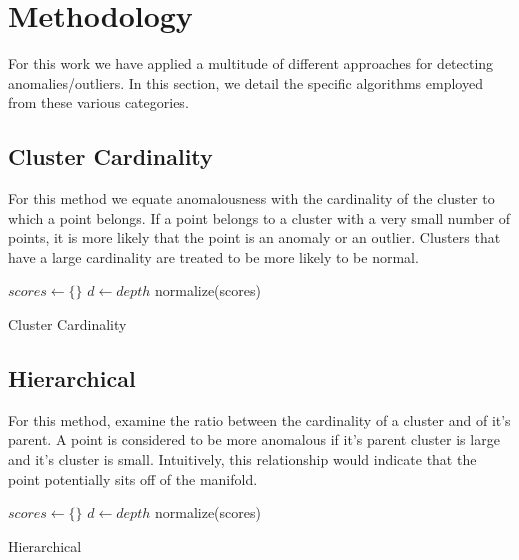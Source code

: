 \section{Methodology}
\label{sec:methodology}

For this work we have applied a multitude of different approaches for detecting anomalies/outliers.
In this section, we detail the specific algorithms employed from these various categories.

\subsection{Cluster Cardinality}

For this method we equate anomalousness with the cardinality of the cluster to which a point belongs.
If a point belongs to a cluster with a very small number of points, it is more likely that the point is an anomaly or an outlier.
Clusters that have a large cardinality are treated to be more likely to be normal.

\begin{algorithm}
\DontPrintSemicolon
\SetAlgoLined
{}
 $scores \leftarrow \{\}$\;
 $d \leftarrow depth$\;
 normalize(scores)\;
 \caption{Cluster Cardinality}
 \label{alg-cc}
\end{algorithm}

\subsection{Hierarchical}

For this method, examine the ratio between the cardinality of a cluster and of it's parent.
A point is considered to be more anomalous if it's parent cluster is large and it's cluster is small.
Intuitively, this relationship would indicate that the point potentially sits off of the manifold.

\begin{algorithm}
\DontPrintSemicolon
\SetAlgoLined
{}
 $scores \leftarrow \{\}$\;
 $d \leftarrow depth$\;
 normalize(scores)\;
 \caption{Hierarchical}
 \label{alg-hierarchical}
\end{algorithm}

